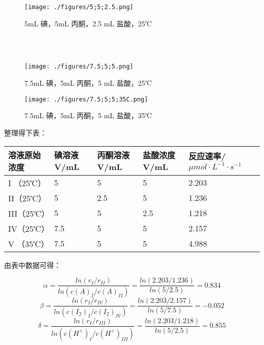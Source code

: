\documentclass[4pt,a4papper]{article}
\begin{document}
\newpage

    \begin{figure}[htp]
        \centering
        \texttt{[image: ./figures/5;5;2.5.png]}
        \caption{5mL 碘，5mL 丙酮，2.5 mL 盐酸，25℃} \label{fig: 3}
    \end{figure}
~\\
~\\
    \begin{figure}[hbp]
        \centering
        \texttt{[image: ./figures/7.5;5;5.png]}
        \caption{7.5mL 碘，5mL 丙酮，5 mL 盐酸，25℃} \label{fig: 4}
    \end{figure}

\newpage
    \begin{figure}[htp]
        \centering
        \texttt{[image: ./figures/7.5;5;5;35C.png]}
        \caption{7.5mL 碘，5mL 丙酮，5 mL 盐酸，35℃} \label{fig: 5}
    \end{figure}


整理得下表：
\begin{table}[htbp]
\centering
\begin{tabular}{|l|l|l|l|l|}
\hline
溶液原始浓度   & 碘溶液 V/mL & 丙酮溶液 V/mL & 盐酸浓度 V/mL & 反应速率/ $\mu mol\cdot L^{-1}\cdot s^{-1}$ \\ \hline
I （25℃）   & 5        & 5         & 5         & 2.203                                     \\ \hline
II（25℃）  & 5        & 2.5       & 5         & 1.236                                     \\ \hline
III（25℃） & 5        & 5         & 2.5       & 1.218                                     \\ \hline
IV（25℃）  & 7.5      & 5         & 5         & 2.157                                     \\ \hline
V （35℃）   & 7.5      & 5         & 5         & 4.988                                     \\ \hline
\end{tabular}
\end{table}



由表中数据可得：

$$
\alpha = \frac{ln(r_I/r_{II})}{ln(c(A)_I/c(A)_{II})} = \frac{ln(2.203/1.236)}{ln(5/2.5)} = 0.834
$$
$$
\beta = \frac{ln(r_I/r_{IV})}{ln(c(I_2)_I/c(I_2)_{IV})} = \frac{ln(2.203/2.157)}{ln(5/7.5)} = -0.052
$$
$$
\delta = \frac{ln(r_I/r_{III})}{ln(c(H^+)_I/c(H^+)_{III})} = \frac{ln(2.203/1.218)}{ln(5/2.5)} = 0.855
$$
\end{document}
